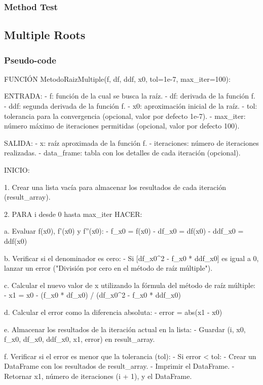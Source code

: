 \documentclass{article}
\begin{document}
        \subsubsection{Method Test}

    \subsection{Multiple Roots}
        \subsubsection{Pseudo-code}
        FUNCIÓN MetodoRaizMultiple(f, df, ddf, x0, tol=1e-7, max_iter=100):

    ENTRADA:
    - f: función de la cual se busca la raíz.
    - df: derivada de la función f.
    - ddf: segunda derivada de la función f.
    - x0: aproximación inicial de la raíz.
    - tol: tolerancia para la convergencia (opcional, valor por defecto 1e-7).
    - max_iter: número máximo de iteraciones permitidas (opcional, valor por defecto 100).

    SALIDA:
    - x: raíz aproximada de la función f.
    - iteraciones: número de iteraciones realizadas.
    - data_frame: tabla con los detalles de cada iteración (opcional).

    INICIO:

    1. Crear una lista vacía para almacenar los resultados de cada iteración (result_array).

    2. PARA i desde 0 hasta max_iter HACER:

        a. Evaluar f(x0), f'(x0) y f''(x0):
           - f_x0 = f(x0)
           - df_x0 = df(x0)
           - ddf_x0 = ddf(x0)

        b. Verificar si el denominador es cero:
           - Si [df_x0^2 - f_x0 * ddf_x0] es igual a 0, lanzar un error ("División por cero en el método de raíz múltiple").

        c. Calcular el nuevo valor de x utilizando la fórmula del método de raíz múltiple:
           - x1 = x0 - (f_x0 * df_x0) / (df_x0^2 - f_x0 * ddf_x0)

        d. Calcular el error como la diferencia absoluta:
           - error = abs(x1 - x0)

        e. Almacenar los resultados de la iteración actual en la lista:
           - Guardar (i, x0, f_x0, df_x0, ddf_x0, x1, error) en result_array.

        f. Verificar si el error es menor que la tolerancia (tol):
           - Si error < tol:
              - Crear un DataFrame con los resultados de result_array.
              - Imprimir el DataFrame.
              - Retornar x1, número de iteraciones (i + 1), y el DataFrame.
\end{document}
